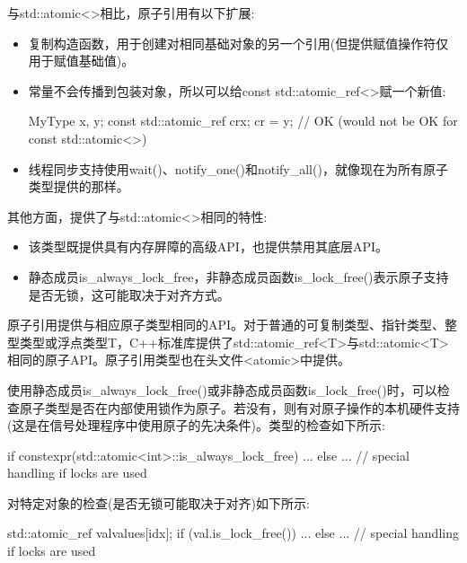 与std::atomic<>相比，原子引用有以下扩展:

\begin{itemize}
\item
复制构造函数，用于创建对相同基础对象的另一个引用(但提供赋值操作符仅用于赋值基础值)。

\item
常量不会传播到包装对象，所以可以给const std::atomic\_ref<>赋一个新值:

\begin{cpp}
MyType x, y;
const std::atomic_ref cr{x};
cr = y; // OK (would not be OK for const std::atomic<>)
\end{cpp}

\item
线程同步支持使用wait()、notify\_one()和notify\_all()，就像现在为所有原子类型提供的那样。
\end{itemize}

其他方面，提供了与std::atomic<>相同的特性:

\begin{itemize}
\item
该类型既提供具有内存屏障的高级API，也提供禁用其底层API。

\item
静态成员is\_always\_lock\_free，非静态成员函数is\_lock\_free()表示原子支持是否无锁，这可能取决于对齐方式。
\end{itemize}


原子引用提供与相应原子类型相同的API。对于普通的可复制类型、指针类型、整型类型或浮点类型T，C++标准库提供了std::atomic\_ref<T>与std::atomic<T>相同的原子API。原子引用类型也在头文件<atomic>中提供。

使用静态成员is\_always\_lock\_free()或非静态成员函数is\_lock\_free()时，可以检查原子类型是否在内部使用锁作为原子。若没有，则有对原子操作的本机硬件支持(这是在信号处理程序中使用原子的先决条件)。类型的检查如下所示:

\begin{cpp}
if constexpr(std::atomic<int>::is_always_lock_free) {
	...
}
else {
	... // special handling if locks are used
}
\end{cpp}

对特定对象的检查(是否无锁可能取决于对齐)如下所示:

\begin{cpp}
std::atomic_ref val{values[idx]};
if (val.is_lock_free()) {
	...
}
else {
	... // special handling if locks are used
}
\end{cpp}


